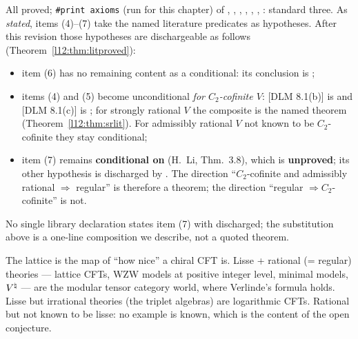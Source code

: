 \begin{status}
All proved; \texttt{\#print axioms} (run for this chapter) of ,
, ,
, ,
, :
standard three. As \emph{stated}, items (4)--(7) take the named literature predicates as hypotheses. After this revision
those hypotheses are dischargeable as follows (Theorem~\ref{l12:thm:litproved}):
\begin{itemize}
\item item (6) has no remaining content as a conditional: its conclusion is ;
\item items (4) and (5) become unconditional \emph{for $C_2$-cofinite $V$}: [DLM 8.1(b)] is
   and [DLM 8.1(c)] is ;
  for strongly rational $V$ the composite is the named theorem 
  (Theorem~\ref{l12:thm:srlit}). For admissibly rational $V$ not known to be $C_2$-cofinite they stay conditional;
\item item (7) remains \textbf{conditional on } (H.~Li, Thm.~3.8), which is \textbf{unproved}; its
  other hypothesis  is discharged by . The direction ``$C_2$-cofinite and
  admissibly rational $\Rightarrow$ regular'' is therefore a theorem; the direction ``regular $\Rightarrow C_2$-cofinite'' is not.
\end{itemize}
No single library declaration states item (7) with  discharged; the substitution above is a one-line composition
we describe, not a quoted theorem.
\end{status}

\begin{physics}
The lattice is the map of ``how nice'' a chiral CFT is. Lisse + rational (= regular) theories --- lattice CFTs, WZW models
at positive integer level, minimal models, ${V^{\natural}}$ --- are the modular tensor category world, where Verlinde's formula
holds. Lisse but irrational theories (the triplet algebras) are logarithmic CFTs. Rational but not known to be lisse: no
example is known, which is the content of the open conjecture.
\end{physics}

